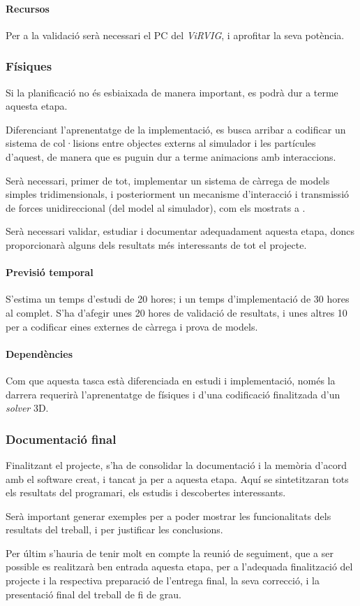 \documentclass[a4paper]{article} %
\begin{document}
	\paragraph{\quad Recursos} Per a la validació serà necessari el PC del \textit{ViRVIG}, i aprofitar la seva potència.
	
	\subsubsection{Físiques}
	Si la planificació no és esbiaixada de manera important, es podrà dur a terme aquesta etapa. \par
	Diferenciant l'aprenentatge de la implementació, es busca arribar a codificar un sistema de col·lisions entre objectes externs al simulador i les partícules d'aquest, de manera que es puguin dur a terme animacions amb interaccions. \par
	Serà necessari, primer de tot, implementar un sistema de càrrega de models simples tridimensionals, i posteriorment un mecanisme d'interacció i transmissió de forces unidireccional (del model al simulador), com els mostrats a \cite{Ericson2005}. \par
	Serà necessari validar, estudiar i documentar adequadament aquesta etapa, doncs proporcionarà alguns dels resultats més interessants de tot el projecte.
	\paragraph{\quad Previsió temporal} S'estima un temps d'estudi de 20 hores; i un temps d'implementació de 30 hores al complet. S'ha d'afegir unes 20 hores de validació de resultats, i unes altres 10 per a codificar eines externes de càrrega i prova de models.
	\paragraph{\quad Dependències} Com que aquesta tasca està diferenciada en estudi i implementació, només la darrera requerirà l'aprenentatge de físiques i d'una codificació finalitzada d'un \textit{solver} 3D.
	
	\subsubsection{Documentació final}
	Finalitzant el projecte, s'ha de consolidar la documentació i la memòria d'acord amb el software creat, i tancat ja per a aquesta etapa. Aquí se sintetitzaran tots els resultats del programari, els estudis i descobertes interessants. \par
	Serà important generar exemples per a poder mostrar les funcionalitats dels resultats del treball, i per justificar les conclusions.\par
	Per últim s'hauria de tenir molt en compte la reunió de seguiment, que a ser possible es realitzarà ben entrada aquesta etapa, per a l'adequada finalització del projecte i la respectiva preparació de l'entrega final, la seva correcció, i la presentació final del treball de fi de grau.
\end{document}
